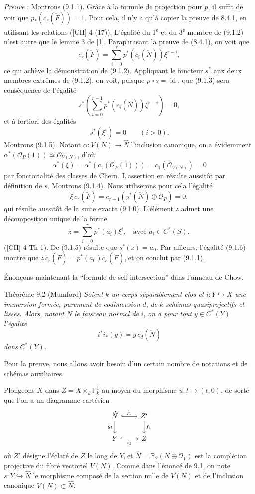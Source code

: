 \emph{Preuve} : Montrons (9.1.1). Grâce à la formule de projection pour $p$, il suffit de voir que $p_*(c_r(\check F))=1$. Pour cela, il n'y a qu'à copier la preuve de 8.4.1, en utilisant les relations ([CH] 4 (17)). L'égalité du 1\textsuperscript{e} et du 3\textsuperscript{e} membre de (9.1.2) n'est autre que le lemme 3 de [1]. Paraphrasant la preuve de (8.4.1), on voit que
\[
c_r(\check F)=\sum_{i=0}^r p^*(c_i(\check N))\xi^{r-i},
\tag*{(9.1.2) bis}
\]
ce qui achève la démonstration de (9.1.2). Appliquant le foncteur $s^*$ aux deux membres extrêmes de (9.1.2), on voit, puisque $p\circ s=\operatorname{id}$, que (9.1.3) sera conséquence de l'égalité
\[
s^*\left(\sum_{i=0}^{r-1}p^*(c_i(\check N))\xi^{r-i}\right)=0,
\]
et à fortiori des égalités
\[
s^*(\xi^i)=0\qquad(i>0).
\tag{9.1.5}
\]
Montrons (9.1.5). Notant $\alpha:V(N)\to\widehat N$ l'inclusion canonique, on a évidemment $\alpha^*(\mathcal{O}_P(1))\simeq\mathcal{O}_{V(N)}$, d'où
\[
\alpha^*(\xi)=\alpha^*(c_1(\mathcal{O}_P(1)))=c_1(\mathcal{O}_{V(N)})=0
\]
par fonctorialité des classes de Chern. L'assertion en résulte aussitôt par définition de $s$. Montrons (9.1.4). Nous utiliserons pour cela l'égalité
\[
\xi\,c_r(\check F)=c_{r+1}(p^*(\check N)\oplus\mathcal{O}_P)=0,
\tag{9.1.6}
\]
qui résulte aussitôt de la suite exacte (9.1.0). L'élément $z$ admet une décomposition unique de la forme
\[
z=\sum_{i=0}^r p^*(a_i)\xi^i,\quad\text{avec }a_i\in C^*(S),
\]
([CH] 4 Th 1). De (9.1.5) résulte que $s^*(z)=a_0$. Par ailleurs, l'égalité (9.1.6) montre que $z\,c_r(\check F)=p^*(a_0)c_r(\check F)$, et on conclut par (9.1.1).

Énonçons maintenant la ``formule de self-intersection'' dans l'anneau de Chow.

\begin{statement}{Théorème 9.2 (Mumford)}
\emph{Soient} $k$ \emph{un corps séparablement clos et} $i:Y\hookrightarrow X$ \emph{une immersion fermée, purement de codimension} $d$, \emph{de} $k$-\emph{schémas quasiprojectifs et lisses}. \emph{Alors, notant} $N$ \emph{le faisceau normal de} $i$, \emph{on a pour tout} $y\in C^*(Y)$ \emph{l'égalité}
\[
i^*i_*(y)=y\,c_d(\check N)
\]
\emph{dans} $C^*(Y)$.
\end{statement}

Pour la preuve, nous allons avoir besoin d'un certain nombre de notations et de schémas auxiliaires.

Plongeons $X$ dans $Z=X\times_k\mathbb{P}^1_k$ au moyen du morphisme $u:t\mapsto(t,0)$, de sorte que l'on a un diagramme cartésien
\[
\begin{tikzcd}
\widehat N \arrow[r,hook,"j_1"] \arrow[d,"g_1"'] & Z' \arrow[d,"f_1"]\\
Y \arrow[r,hook,"i_1"'] & Z
\end{tikzcd}
\]
où $Z'$ désigne l'éclaté de $Z$ le long de $Y$, et $\widehat N=\mathbb{P}_Y(N\oplus\mathcal{O}_Y)$ est la complétion projective du fibré vectoriel $V(N)$. Comme dans l'énoncé de 9.1, on note $s:Y\hookrightarrow\widehat N$ le morphisme composé de la section nulle de $V(N)$ et de l'inclusion canonique $V(N)\subset\widehat N$.

